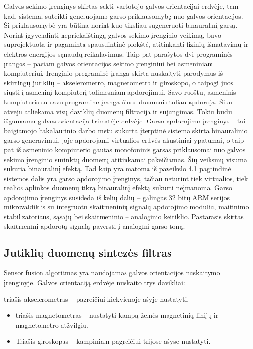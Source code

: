 \documentclass[]{vgtuef}
\begin{document}
Galvos sekimo įrenginys skirtas sekti vartotojo galvos orientacijai erdvėje, tam kad, sistemai suteikti generuojamo garso priklausomybę nuo galvos orientacijos. Ši priklausomybė yra būtina norint kuo tiksliau sugeneruoti binauralinį garsą. Norint įgyvendinti nepriekaištingą galvos sekimo įrenginio veikimą, buvo suprojektuota ir pagaminta spausdintinė plokštė, atitinkanti fizinių išmatavimų ir elektros energijos sąnaudų reikalavimus. Taip pat parašytos dvi programinės įrangos – pačiam galvos orientacijos sekimo įrenginiui bei asmeniniam kompiuteriui. Įrenginio programinė įranga skirta nuskaityti parodymus iš skirtingų jutiklių – akselerometro, magnetometro ir giroskopo, o taipogi juos siųsti į asmeninį kompiuterį tolimesniam apdorojimui. Savo ruoštu, asmeninis kompiuteris su savo programine įranga šiuos duomenis toliau apdoroja. Šiuo atveju atliekama visų daviklių duomenų filtracija ir sujungimas. Tokiu būdu išgaunama galvos orientacija trimatėje erdvėje.
Garso apdorojimo įrenginys – tai baigiamojo bakalaurinio darbo metu sukurta įterptinė sistema skirta binauralinio garso generavimui, joje apdorojami virtualios erdvės akustiniai ypatumai, o taip pat iš asmeninio kompiuterio gautas monofoninis garsas priklausomai nuo galvos sekimo įrenginio surinktų duomenų atitinkamai pakeičiamas. Šių veiksmų visuma sukuria binauralinį efektą. Tad kaip yra matoma iš paveikslo 4.1 pagrindinė sistemos dalis yra garso apdorojimo įrenginys, tačiau neturint tiek virtualios, tiek realios aplinkos duomenų tikrą binauralinį efektą sukurti neįmanoma. Garso apdorojimo įrenginys susideda iš kelių dalių – galingas 32 bitų ARM serijos mikrovaldiklis su integruotu skaitmeninių signalų apdorojimo moduliu, maitinimo stabilizatoriaus, sąsajų bei skaitmeninio – analoginio keitiklio. Pastarasis skirtas skaitmeninį apdorotą signalą paversti į analoginį garso toną. 

\subsection{Jutiklių duomenų sintezės filtras}

Sensor fusion algoritmas yra naudojamas galvos orientacijos nuskaitymo įrenginyje. Galvos orientaciją erdvėje nuskaito trys davikliai: 

triašis akselerometras – pagreičiui kiekvienoje ašyje nustatyti.
\begin{itemize}
\item triašis magnetometras – nustatyti kampą žemės magnetinių linijų ir magnetometro atžvilgiu.
\item Triašis giroskopas – kampiniam pagreičiui trijose ašyse nustatyti.
\end{itemize}
\end{document}
